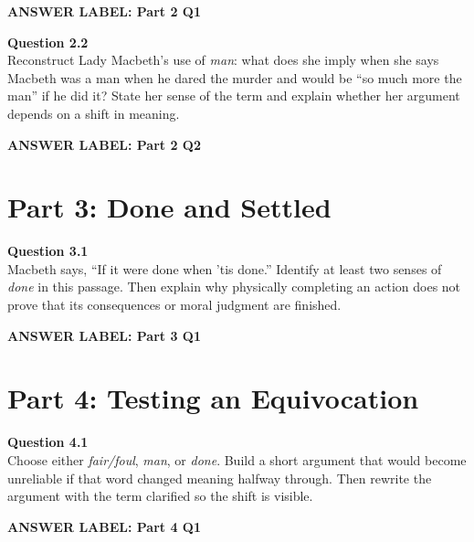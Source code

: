 \documentclass[12pt]{article}
\newcommand{\answerbox}[2]{%
\vspace{0.12em}
\noindent\textbf{#1}\par
\vspace{0.04em}
\noindent\fbox{%
\begin{minipage}[t][#2]{\dimexpr\textwidth-2\fboxsep-2\fboxrule}
\rule{\textwidth}{0pt}
\vspace{#2}
\end{minipage}}
\par\vspace{0.22em}}
\begin{document}
\answerbox{ANSWER LABEL: Part 2 Q1}{2.35in}

\textbf{Question 2.2}\\[-0.15em]
Reconstruct Lady Macbeth's use of \textit{man}: what does she imply when she says Macbeth was a man when he dared the murder and would be ``so much more the man'' if he did it? State her sense of the term and explain whether her argument depends on a shift in meaning.

\answerbox{ANSWER LABEL: Part 2 Q2}{2.45in}

\newpage

\section*{Part 3: Done and Settled}

\textbf{Question 3.1}\\[-0.15em]
Macbeth says, ``If it were done when 'tis done.'' Identify at least two senses of \textit{done} in this passage. Then explain why physically completing an action does not prove that its consequences or moral judgment are finished.

\answerbox{ANSWER LABEL: Part 3 Q1}{2.65in}

\section*{Part 4: Testing an Equivocation}

\textbf{Question 4.1}\\[-0.15em]
Choose either \textit{fair/foul}, \textit{man}, or \textit{done}. Build a short argument that would become unreliable if that word changed meaning halfway through. Then rewrite the argument with the term clarified so the shift is visible.

\answerbox{ANSWER LABEL: Part 4 Q1}{2.75in}
\end{document}
